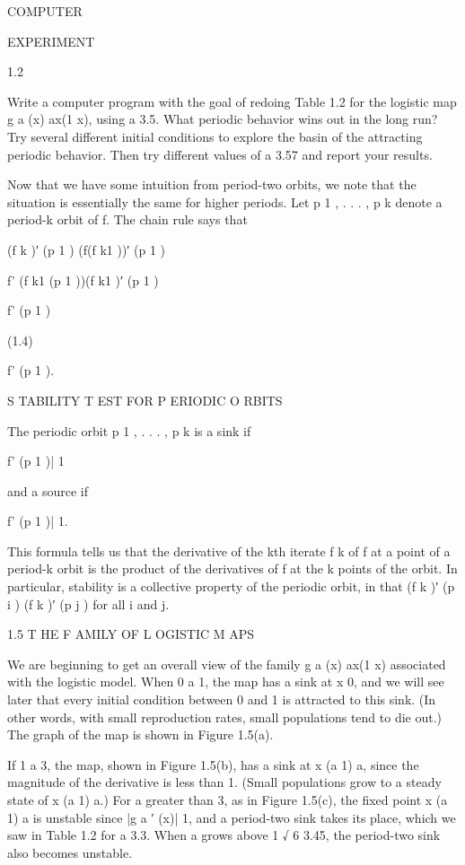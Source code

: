 \documentclass[12pt]{article}
\begin{document}
COMPUTER

EXPERIMENT

1.2

Write a computer program with the goal of redoing Table 1.2 for the logistic map g a (x)  ax(1  x), using a  
3.5. What periodic behavior wins out in the long run? Try several different initial conditions to explore 
the basin of the attracting periodic behavior. Then try different values of a  3.57 and report your 
results.

Now that we have some intuition from period-two orbits, we note that the situation is essentially the same 
for higher periods. Let p 1 , . . . , p k  denote a period-k orbit of f. The chain rule says that

(f k )′ (p 1 )  (f(f k1 ))′ (p 1 )

 f' (f k1 (p 1 ))(f k1 )′ (p 1 )

 f' (p 1 )

(1.4)

 f' (p 1 ).

S TABILITY T EST FOR P ERIODIC O RBITS

The periodic orbit p 1 , . . . , p k  is a sink if

 f' (p 1 )|  1

and a source if

 f' (p 1 )| 
 1.


This formula tells us that the derivative of the kth iterate f k of f at a point of a period-k orbit is the 
product of the derivatives of f at the k points of the orbit. In particular, stability is a collective 
property of the periodic orbit, in that (f k )′ (p i )  (f k )′ (p j ) for all i and j.

1.5 T HE F AMILY OF L OGISTIC M APS

We are beginning to get an overall view of the family g a (x)  ax(1  x) associated with the logistic model. 
When 0 a  1, the map has a sink at x  0, and we will see later that every initial condition between 0 and 1 
is attracted to this sink. (In other words, with small reproduction rates, small populations tend to die 
out.) The graph of the map is shown in Figure 1.5(a).

If 1  a  3, the map, shown in Figure 1.5(b), has a sink at x  (a  1)  a, since the magnitude of the 
derivative is less than 1. (Small populations grow to a steady state of x  (a  1)  a.) For a greater than 
3, as in Figure 1.5(c), the ﬁxed point x  (a  1)  a is unstable since |g a ′ (x)| 
 1, and a period-two sink takes its place, which we saw in Table 1.2 for a  3.3. When a grows above 1 √ 6  
3.45, the period-two sink also becomes unstable.
\end{document}
